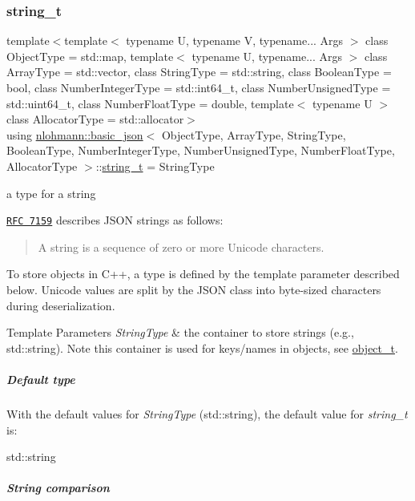 \subsubsection{\texorpdfstring{string\+\_\+t}{string\_t}}
{\footnotesize\ttfamily template$<$template$<$ typename U, typename V, typename... Args $>$ class Object\+Type = std\+::map, template$<$ typename U, typename... Args $>$ class Array\+Type = std\+::vector, class String\+Type  = std\+::string, class Boolean\+Type  = bool, class Number\+Integer\+Type  = std\+::int64\+\_\+t, class Number\+Unsigned\+Type  = std\+::uint64\+\_\+t, class Number\+Float\+Type  = double, template$<$ typename U $>$ class Allocator\+Type = std\+::allocator$>$ \\
using \hyperlink{classnlohmann_1_1basic__json}{nlohmann\+::basic\+\_\+json}$<$ Object\+Type, Array\+Type, String\+Type, Boolean\+Type, Number\+Integer\+Type, Number\+Unsigned\+Type, Number\+Float\+Type, Allocator\+Type $>$\+::\hyperlink{classnlohmann_1_1basic__json_ab63e618bbb0371042b1bec17f5891f42}{string\+\_\+t} =  String\+Type}



a type for a string 

\href{http://rfc7159.net/rfc7159}{\tt R\+FC 7159} describes J\+S\+ON strings as follows\+: \begin{quote}
A string is a sequence of zero or more Unicode characters. \end{quote}


To store objects in C++, a type is defined by the template parameter described below. Unicode values are split by the J\+S\+ON class into byte-\/sized characters during deserialization.


\begin{DoxyTemplParams}{Template Parameters}
{\em String\+Type} & the container to store strings (e.\+g., {\ttfamily std\+::string}). Note this container is used for keys/names in objects, see \hyperlink{classnlohmann_1_1basic__json_a0ac9894c9de8dc551cf2e5f1c605537f}{object\+\_\+t}.\\
\hline
\end{DoxyTemplParams}
\subparagraph*{Default type}

With the default values for {\itshape String\+Type} ({\ttfamily std\+::string}), the default value for {\itshape string\+\_\+t} is\+:


\begin{DoxyCode}
std::string
\end{DoxyCode}


\subparagraph*{String comparison}

